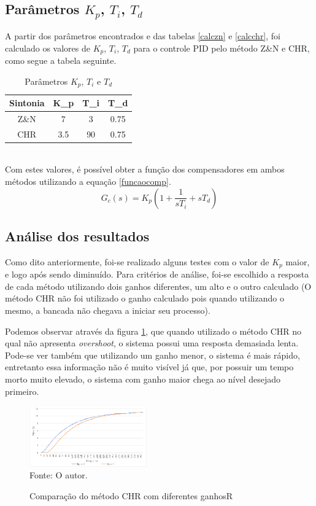 \documentclass[12 pt,conference]{IEEEtran}
\begin{document}
    \subsection{Parâmetros \(K_p\), \(T_i\), \(T_d\)}
    
    A partir dos parâmetros encontrados e das tabelas \ref{calczn} e \ref{calcchr}, foi calculado os valores de $K_p$, $T_i$, $T_d$ para o controle PID pelo método Z\&N e CHR, como segue a tabela seguinte.
    \begin{table}[!h]
        \centering
        \caption{Parâmetros \(K_p\), \(T_i\) e \(T_d\) }
        \begin{tabular}{|c|c|c|c|} \hline
        Sintonia & K_p & T_i & T_d \\ \hline
        Z\&N & 7 & 3 & 0.75 \\ \hline
        CHR & 3.5 & 90 & 0.75 \\ \hline        \end{tabular}
        \end{table}\\
     Com estes valores, é possível obter a função dos compensadores em ambos métodos utilizando a equação \ref{funcaocomp}. 
     \begin{equation}
        G_c(s) = K_p(1+ \frac{1}{sT_i}+sT_d)
        \label{funcaocomp}
     \end{equation}
     
     \subsection{Análise dos resultados}
     
     Como dito anteriormente, foi-se realizado alguns testes com o valor de $K_p$ maior, e logo após sendo diminuído. Para critérios de análise, foi-se escolhido a resposta de cada método utilizando dois ganhos diferentes, um alto e o outro calculado (O método CHR não foi utilizado o ganho calculado pois quando utilizando o mesmo, a bancada não chegava a iniciar seu processo).

    Podemos observar através da figura \ref{CHR}, que quando utilizado o método CHR no qual não apresenta \textit{overshoot}, o sistema possui uma resposta demasiada lenta. Pode-se ver também que utilizando um ganho menor, o sistema é mais rápido, entretanto essa informação não é muito visível já que, por possuir um tempo morto muito elevado, o sistema com ganho maior chega ao nível desejado primeiro.
    
    \begin{figure}[!http]
       \centering
        \caption{Comparação do método CHR com diferentes ganhosR}
        \includegraphics[width=0.45\textwidth]{imagens/grafico_CHR.png}\\ 
        Fonte: O autor.
        \label{CHR}
    \end{figure}
    
\end{document}
